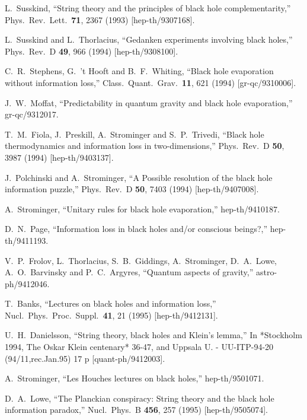 \documentclass[12pt]{article}
\begin{document}
\begin{thebibliography}{99}
  L.~Susskind,
  ``String theory and the principles of black hole complementarity,''
  Phys.\ Rev.\ Lett.\  {\bf 71}, 2367 (1993)
  [hep-th/9307168].

  L.~Susskind and L.~Thorlacius,
  ``Gedanken experiments involving black holes,''
  Phys.\ Rev.\ D {\bf 49}, 966 (1994)
  [hep-th/9308100].
  
  C.~R.~Stephens, G.~'t Hooft and B.~F.~Whiting,
  ``Black hole evaporation without information loss,''
  Class.\ Quant.\ Grav.\  {\bf 11}, 621 (1994)
  [gr-qc/9310006].
  
  J.~W.~Moffat,
  ``Predictability in quantum gravity and black hole evaporation,''
  gr-qc/9312017.
  
  T.~M.~Fiola, J.~Preskill, A.~Strominger and S.~P.~Trivedi,
  ``Black hole thermodynamics and information loss in two-dimensions,''
  Phys.\ Rev.\ D {\bf 50}, 3987 (1994)
  [hep-th/9403137].
  
  J.~Polchinski and A.~Strominger,
  ``A Possible resolution of the black hole information puzzle,''
  Phys.\ Rev.\ D {\bf 50}, 7403 (1994)
  [hep-th/9407008]. 
  
  A.~Strominger,
  ``Unitary rules for black hole evaporation,''
  hep-th/9410187. 

  D.~N.~Page,
  ``Information loss in black holes and/or conscious beings?,''
  hep-th/9411193.

  V.~P.~Frolov, L.~Thorlacius, S.~B.~Giddings, A.~Strominger, D.~A.~Lowe, A.~O.~Barvinsky and P.~C.~Argyres,
  ``Quantum aspects of gravity,''
  astro-ph/9412046.

  T.~Banks,
  ``Lectures on black holes and information loss,''
  Nucl.\ Phys.\ Proc.\ Suppl.\  {\bf 41}, 21 (1995)
  [hep-th/9412131].

  U.~H.~Danielsson,
  ``String theory, black holes and Klein's lemma,''
  In *Stockholm 1994, The Oskar Klein centenary* 36-47, and Uppsala U. -   UU-ITP-94-20 (94/11,rec.Jan.95) 17 p
  [quant-ph/9412003].

  A.~Strominger,
  ``Les Houches lectures on black holes,''
  hep-th/9501071.

  D.~A.~Lowe,
  ``The Planckian conspiracy: String theory and the black hole information paradox,''
  Nucl.\ Phys.\ B {\bf 456}, 257 (1995)
  [hep-th/9505074].


\end{thebibliography}
\end{document}
